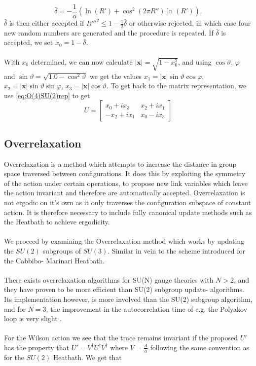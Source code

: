 \documentclass[a4paper,10pt]{book}
\begin{document}
\begin{equation}
\bar{\delta} = -\frac{1}{\alpha}\left(\ln \left(R'\right)+\cos ^{2}\left(2 \pi R''\right) \ln \left(R'\right)\right).
\end{equation}
$\bar{\delta}$ is then either accepted if 
$R'''^2 \leq 1-\frac{1}{2}\bar{\delta}$ or otherwise rejected, in which case four new random numbers are generated and the procedure is repeated. If $\bar{\delta}$ is accepted, we set $x_0 = 1-\bar{\delta}$.\\\\With $x_0$ determined, we can now calculate $|\mathbf{x}| = \sqrt{1-x_0^2}$, and using $\cos \vartheta$, $\varphi$ and $\sin \vartheta = \sqrt{1.0-\cos^2 \vartheta}$ we get the values $x_1 = |\mathbf{x}|\sin \vartheta \cos\varphi$, $x_2 = |\mathbf{x}|\sin \vartheta \sin\varphi$, $x_3 = |\mathbf{x}|\cos \vartheta$. To get back to the matrix representation, we use \eqref{eq:O(4)SU(2)rep} to get
\begin{equation}
U=\left[\begin{array}{ll}
x_0+ix_3 & x_2+ix_1 \\
-x_2+ix_1 & x_0-ix_3
\end{array}\right]
\end{equation}
\subsection{Overrelaxation}
Overrelaxation is a method which attempts to increase the distance in group space traversed between configurations. It does this by exploiting the symmetry of the action under certain operations, to propose new link variables which leave the action invariant and therefore are automatically accepted.
Overrelaxation is not ergodic on it's own as it only traverses the configuration subspace of constant action. It is therefore necessary to include fully canonical update methods such as the Heatbath to achieve ergodicity.\\\\We proceed by examining the Overrelaxation method which works by updating the $SU(2)$ subgroups of $SU(3)$. Similar in vein to the scheme introduced for the Cabbibo- Marinari Heatbath.\\\\There exists overrelaxation algorithms for SU(N) gauge theories with $N>2$, and they have proven to be more efficient than SU(2) subgroup update- algorithms. Its implementation however, is more involved than the SU(2) subgroup algorithm, and for $N=3$, the improvement in the autocorrelation time of e.g. the Polyakov loop is very slight \cite{inbook}.\\\\For the Wilson action we see that the trace remains invariant if the proposed $U'$ has the property that $U' = V^\dagger U^\dagger V^\dagger$ where $V = \frac{A}{a}$ following the same convention as for the $SU(2)$ Heatbath. We get that
\end{document}
